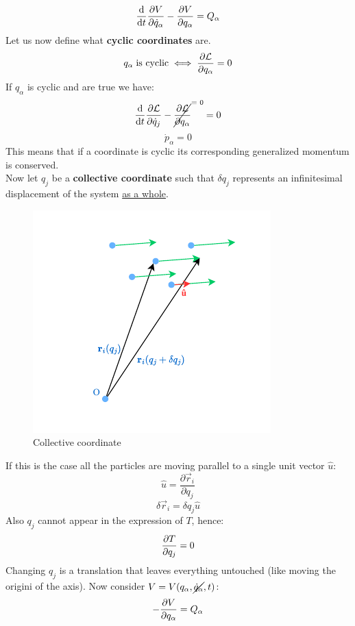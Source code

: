 \begin{equation}
    \dv{}{t}\pdv{V}{\dot{q}_{\alpha}}-\pdv{V}{q_{\alpha}} = Q_{\alpha}
\end{equation}
Let us now define what \textbf{cyclic coordinates} are.
\begin{equation}
    q_{\alpha}\;\text{is cyclic} \iff \pdv{\lagr}{q_{\alpha}} = 0
\end{equation}
If $q_{\alpha}$ is cyclic and \eleref\;are true we have:
\begin{equation}
    \dv{}{t} \pdv{\lagr}{\dot{q}_j} - \crossout{\pdv{\lagr}{q_{\alpha}}} = 0
\end{equation}
\begin{equation}
    \dot{p}_{\alpha} = 0
\end{equation}
This means that if a coordinate is cyclic its corresponding generalized momentum is conserved.\\
Now let $q_j$ be a \textbf{collective coordinate} such that $\delta q_j$ represents an infinitesimal displacement of the system \underline{as a whole}.
\begin{figure}[H]
    \centering
    \includegraphics[width=0.4\linewidth]{res/svg/collectivecoord.drawio}
    \caption{Collective coordinate}
\end{figure}
If this is the case all the particles are moving parallel to a single unit vector $\hat{u}$:
\begin{equation}
    \hat{u} = \dfrac{\partial \vec{r}_i}{\partial q_j}
\end{equation}
\begin{equation}
    \delta \vec{r}_i = \delta q_j \hat{u}
\end{equation}
Also $q_j$ cannot appear in the expression of $T$, hence:
\begin{equation}
    \pdv{T}{q_j}=0
\end{equation}
Changing $q_j$ is a translation that leaves everything untouched (like moving the origini of the axis). Now consider $V=V(q_{\alpha},\cancel{\dot{q}_{\alpha}},t)$:
\begin{equation}
    -\pdv{V}{q_{\alpha}} = Q_{\alpha}
\end{equation}
